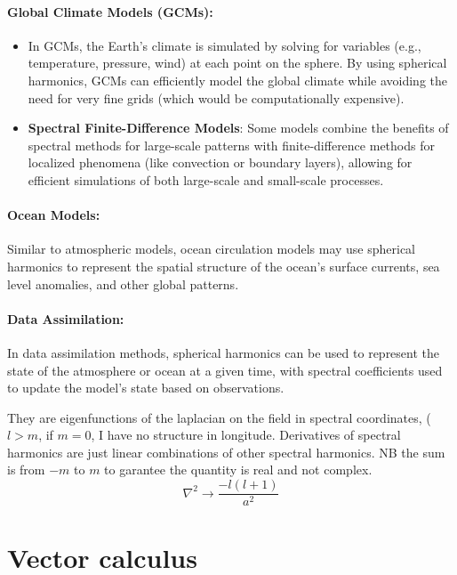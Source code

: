 \paragraph{\textbf{Global Climate Models (GCMs)}:}

\begin{itemize}
    \item In GCMs, the Earth's climate is simulated by solving for variables (e.g., temperature, pressure, wind) at each point on the sphere. By using spherical harmonics, GCMs can efficiently model the global climate while avoiding the need for very fine grids (which would be computationally expensive).
    \item \textbf{Spectral Finite-Difference Models}: Some models combine the benefits of spectral methods for large-scale patterns with finite-difference methods for localized phenomena (like convection or boundary layers), allowing for efficient simulations of both large-scale and small-scale processes.
\end{itemize}

\paragraph{\textbf{Ocean Models}:}

Similar to atmospheric models, ocean circulation models may use spherical harmonics to represent the spatial structure of the ocean's surface currents, sea level anomalies, and other global patterns.

\paragraph{\textbf{Data Assimilation}:}

In data assimilation methods, spherical harmonics can be used to represent the state of the atmosphere or ocean at a given time, with spectral coefficients used to update the model's state based on observations.

 They are eigenfunctions of the laplacian on the field in spectral coordinates, ($l>m$, if $m=0$, I have no structure in longitude. Derivatives of spectral harmonics are just linear combinations of other spectral harmonics. NB the sum is from $-m$ to $m$ to garantee the quantity is real and not complex. $$\nabla^2\rightarrow \frac{-l(l+1)}{a^2}$$
\section{Vector calculus}
